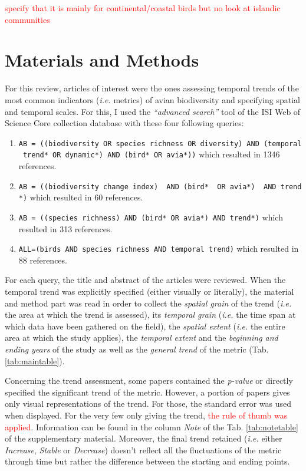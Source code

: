 \documentclass[
  12pt,
  oneside]{report}
\begin{document}
\textcolor{red}{specify that it is mainly for continental/coastal birds but no look at  islandic communities}

\hypertarget{materials-and-methods}{%
\chapter{Materials and Methods}\label{materials-and-methods}}

For this review, articles of interest were the ones assessing temporal trends of the most common indicators (\emph{i.e.} metrics) of avian biodiversity and specifying spatial and temporal scales. For this, I used the \emph{\enquote{advanced search}} tool of the ISI Web of Science Core collection database with these four following queries:

\begin{enumerate}
\def\labelenumi{\arabic{enumi}.}
\item
  \texttt{AB\ =\ ((biodiversity\ OR\ species\ richness\ OR\ diversity)\ AND\ (temporal\ trend*\ OR\ dynamic*)\ AND\ (bird*\ OR\ avia*))} which resulted in 1346 references.
\item
  \texttt{AB\ =\ ((biodiversity\ change\ index)\ \ AND\ (bird*\ \ OR\ avia*)\ \ AND\ trend*)} which resulted in 60 references.
\item
  \texttt{AB\ =\ ((species\ richness)\ AND\ (bird*\ OR\ avia*)\ AND\ trend*)} which resulted in 313 references.
\item
  \texttt{ALL=(birds\ AND\ species\ richness\ AND\ temporal\ trend)} which resulted in 88 references.
\end{enumerate}

For each query, the title and abstract of the articles were reviewed. When the temporal trend was explicitly specified (either visually or literally), the material and method part was read in order to collect the \emph{spatial grain} of the trend (\emph{i.e.} the area at which the trend is assessed), its \emph{temporal grain} (\emph{i.e.} the time span at which data have been gathered on the field), the \emph{spatial extent} (\emph{i.e.} the entire area at which the study applies), the \emph{temporal extent} and the \emph{beginning and ending years} of the study as well as the \emph{general trend} of the metric (Tab. \ref{tab:maintable}).

Concerning the trend assessment, some papers contained the \emph{p-value} or directly specified the significant trend of the metric. However, a portion of papers gives only visual representations of the trend. For those, the standard error was used when displayed. For the very few only giving the trend, \textcolor{red}{the rule of thumb was applied}. Information can be found in the column \emph{Note} of the Tab. \ref{tab:notetable} of the supplementary material. Moreover, the final trend retained (\emph{i.e.} either \emph{Increase}, \emph{Stable} or \emph{Decrease}) doesn't reflect all the fluctuations of the metric through time but rather the difference between the starting and ending points.
\end{document}
